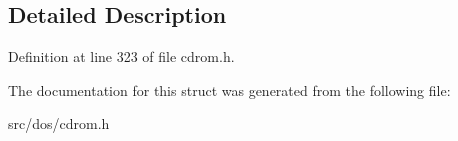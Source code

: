 \subsection{Detailed Description}


Definition at line 323 of file cdrom.\-h.



The documentation for this struct was generated from the following file\-:\begin{DoxyCompactItemize}
\item 
src/dos/cdrom.\-h\end{DoxyCompactItemize}
